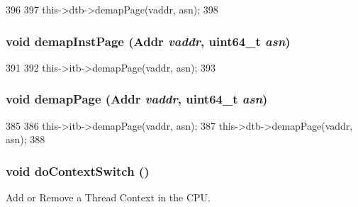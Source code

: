 \begin{DoxyCode}
396     {
397         this->dtb->demapPage(vaddr, asn);
398     }
\end{DoxyCode}
\hypertarget{classFullO3CPU_ac8a36d45a839b07f50b73f1eee119615}{
\subsubsection[{demapInstPage}]{\setlength{\rightskip}{0pt plus 5cm}void demapInstPage ({\bf Addr} {\em vaddr}, \/  uint64\_\-t {\em asn})}}
\label{classFullO3CPU_ac8a36d45a839b07f50b73f1eee119615}



\begin{DoxyCode}
391     {
392         this->itb->demapPage(vaddr, asn);
393     }
\end{DoxyCode}
\hypertarget{classFullO3CPU_a2d698ff909513b48a1263f8a5440e067}{
\subsubsection[{demapPage}]{\setlength{\rightskip}{0pt plus 5cm}void demapPage ({\bf Addr} {\em vaddr}, \/  uint64\_\-t {\em asn})}}
\label{classFullO3CPU_a2d698ff909513b48a1263f8a5440e067}



\begin{DoxyCode}
385     {
386         this->itb->demapPage(vaddr, asn);
387         this->dtb->demapPage(vaddr, asn);
388     }
\end{DoxyCode}
\hypertarget{classFullO3CPU_aa44d4f535cfaf67b335cab7e390a9257}{
\subsubsection[{doContextSwitch}]{\setlength{\rightskip}{0pt plus 5cm}void doContextSwitch ()}}
\label{classFullO3CPU_aa44d4f535cfaf67b335cab7e390a9257}
Add or Remove a Thread Context in the CPU. 


